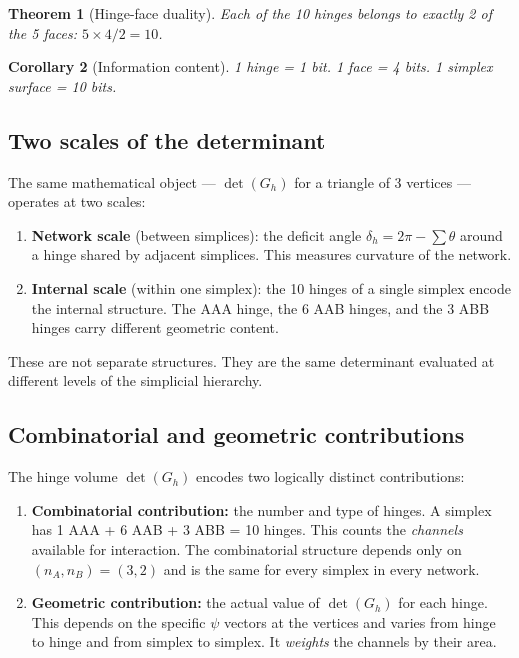 \documentclass[12pt]{article}
\newtheorem{theorem}{Theorem}[section]
\newtheorem{corollary}[theorem]{Corollary}
\theoremstyle{remark}
\theoremstyle{definition}
\begin{document}
\begin{theorem}[Hinge-face duality]
\label{thm:hinge_face}
Each of the 10 hinges belongs to exactly 2 of the 5 faces: $5 \times 4 / 2 = 10$.
\end{theorem}

\begin{corollary}[Information content]
1 hinge = 1 bit. 1 face = 4 bits. 1 simplex surface = 10 bits.
\end{corollary}

\subsection{Two scales of the determinant}

The same mathematical object --- $\det(G_h)$ for a triangle of 3 vertices --- operates at two scales:

\begin{enumerate}
\item \textbf{Network scale} (between simplices): the deficit angle $\delta_h = 2\pi - \sum\theta$ around a hinge shared by adjacent simplices. This measures curvature of the network.
\item \textbf{Internal scale} (within one simplex): the 10 hinges of a single simplex encode the internal structure. The AAA hinge, the 6 AAB hinges, and the 3 ABB hinges carry different geometric content.
\end{enumerate}

These are not separate structures. They are the same determinant evaluated at different levels of the simplicial hierarchy.

\subsection{Combinatorial and geometric contributions}
\label{sec:comb_vs_geom}

The hinge volume $\det(G_h)$ encodes two logically distinct contributions:

\begin{enumerate}
\item \textbf{Combinatorial contribution:} the number and type of hinges. A simplex has 1 AAA + 6 AAB + 3 ABB = 10 hinges. This counts the \emph{channels} available for interaction. The combinatorial structure depends only on $(n_A, n_B) = (3, 2)$ and is the same for every simplex in every network.

\item \textbf{Geometric contribution:} the actual value of $\det(G_h)$ for each hinge. This depends on the specific $\psi$ vectors at the vertices and varies from hinge to hinge and from simplex to simplex. It \emph{weights} the channels by their area.
\end{enumerate}
\end{document}

